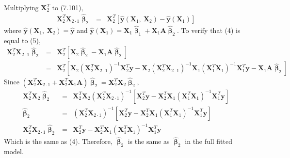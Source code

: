 \documentclass[12pt]{article} %
\begin{document}
\begin{enumerate}
\begin{enumerate}
 	  Multiplying $\mathbf{X}_{2}^{T}$ to (7.101),  
 	  \begin{eqnarray}
 	   	\mathbf{X}_{2}^{T}\mathbf{X}_{2\cdot 1}\hat{\pmb{\upbeta}}_{2}&=&
 	   	\mathbf{X}_{2}^{T}[\hat{\mathbf{y}}(\mathbf{X}_{1},~\mathbf{X}_{2})-\hat{\mathbf{y}}(\mathbf{X}_{1})]
 	  \end{eqnarray} 	  
 	  where $\hat{\mathbf{y}}(\mathbf{X}_{1},~\mathbf{X}_{2})=\hat{\mathbf{y}} $
 	  and
 	  $\hat{\mathbf{y}}(\mathbf{X}_{1})=\mathbf{X}_{1}\hat{\pmb{\upbeta}}_{1}
 	  +\mathbf{X}_{1}\mathbf{A}\hat{\pmb{\upbeta}}_{2}
 	  $. To verify that (4) is equal to (5),  	  
 	  \begin{eqnarray*}
 	   	\mathbf{X}_{2}^{T}\mathbf{X}_{2\cdot 1}\hat{\pmb{\upbeta}}_{2}&=&
 	   	\mathbf{X}_{2}^{T}[\mathbf{X}_{2}\hat{\pmb{\upbeta}}_{2}-\mathbf{X}_{1}\mathbf{A}\hat{\pmb{\upbeta}}_{2}]\\
 	   	&=&
 	   	\mathbf{X}_{2}^{T}[\mathbf{X}_{2}(\mathbf{X}_{2}^{T}\mathbf{X}_{2\cdot
 	   	1})^{-1}\mathbf{X}_{2}^{T}\mathbf{y}-\mathbf{X}_{2}(\mathbf{X}_{2}^{T}\mathbf{X}_{2\cdot
 	   	1})^{-1}\mathbf{X}_{1}
 	   (\mathbf{X}_{1}^{T}\mathbf{X}_{1})^{-1}\mathbf{X}_{1}^{T}\mathbf{y}-\mathbf{X}_{1}\mathbf{A}\hat{\pmb{\upbeta}}_{2}]
 	  \end{eqnarray*}
 	  Since $(\mathbf{X}_{2}^{T}\mathbf{X}_{2\cdot
 	  1}+\mathbf{X}_{2}^{T}\mathbf{X}_{1}\mathbf{A})\hat{\pmb{\upbeta}}_{2}=\mathbf{X}_{2}^{T}\mathbf{X}_{2}
 	  \hat{\pmb{\upbeta}}_{2}$, 
 	  \begin{eqnarray*}
 	   \mathbf{X}_{2}^{T}\mathbf{X}_{2}\hat{\pmb{\upbeta}}_{2}&=&
 	   \mathbf{X}_{2}^{T}\mathbf{X}_{2}(\mathbf{X}_{2}^{T}\mathbf{X}_{2\cdot
 	   	1})^{-1}[\mathbf{X}_{2}^{T}\mathbf{y}-\mathbf{X}_{2}^{T}\mathbf{X}_{1}
 	   (\mathbf{X}_{1}^{T}\mathbf{X}_{1})^{-1}\mathbf{X}_{1}^{T}\mathbf{y}]\\
 	  \hat{\pmb{\upbeta}}_{2}&=&(\mathbf{X}_{2}^{T}\mathbf{X}_{2\cdot
 	   	1})^{-1}[\mathbf{X}_{2}^{T}\mathbf{y}-\mathbf{X}_{2}^{T}\mathbf{X}_{1}
 	   (\mathbf{X}_{1}^{T}\mathbf{X}_{1})^{-1}\mathbf{X}_{1}^{T}\mathbf{y}]\\
 	   \mathbf{X}_{2}^{T}\mathbf{X}_{2\cdot 1}\hat{\pmb{\upbeta}}_{2}&=&
 	   \mathbf{X}_{2}^{T}\mathbf{y}-\mathbf{X}_{2}^{T}\mathbf{X}_{1}
 	   (\mathbf{X}_{1}^{T}\mathbf{X}_{1})^{-1}\mathbf{X}_{1}^{T}\mathbf{y} 	   	   
 	  \end{eqnarray*}
 	  Which is the same as (4). Therefore, $\hat{\pmb{\upbeta}}_{2}$ is the same
 	  as $\hat{\pmb{\upbeta}}_{2}$ in the full fitted model. 	  
  	\end{enumerate}   	 

\end{enumerate}
\end{document}
